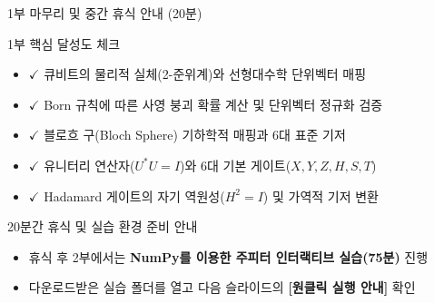 \documentclass[aspectratio=169, 10pt]{beamer}
\begin{document}
\begin{frame}{1부 마무리 및 중간 휴식 안내 (20분)}
    \begin{block}{1부 핵심 달성도 체크}
        \begin{itemize}
            \item $\checkmark$ 큐비트의 물리적 실체(2-준위계)와 선형대수학 단위벡터 매핑
            \item $\checkmark$ Born 규칙에 따른 사영 붕괴 확률 계산 및 단위벡터 정규화 검증
            \item $\checkmark$ 블로흐 구(Bloch Sphere) 기하학적 매핑과 6대 표준 기저
            \item $\checkmark$ 유니터리 연산자($U^* U = I$)와 6대 기본 게이트($X, Y, Z, H, S, T$)
            \item $\checkmark$ Hadamard 게이트의 자기 역원성($H^2 = I$) 및 가역적 기저 변환
        \end{itemize}
    \end{block}
    \vspace{0.25cm}
    \begin{exampleblock}{20분간 휴식 및 실습 환경 준비 안내}
        \begin{itemize}
            \item 휴식 후 2부에서는 \textbf{NumPy를 이용한 주피터 인터랙티브 실습(75분)} 진행
            \item 다운로드받은 실습 폴더를 열고 다음 슬라이드의 \textbf{[원클릭 실행 안내]} 확인
        \end{itemize}
    \end{exampleblock}
\end{frame}
\end{document}
